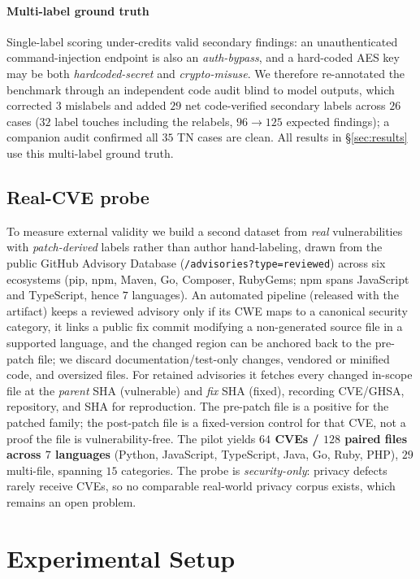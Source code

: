 \documentclass[runningheads]{llncs}
\begin{document}
\paragraph{Multi-label ground truth} Single-label scoring under-credits valid secondary findings: an unauthenticated command-injection endpoint is also an \emph{auth-bypass}, and a hard-coded AES key may be both \emph{hardcoded-secret} and \emph{crypto-misuse}. We therefore re-annotated the benchmark through an independent code audit blind to model outputs, which corrected $3$ mislabels and added $29$ net code-verified secondary labels across $26$ cases ($32$ label touches including the relabels, $96{\to}125$ expected findings); a companion audit confirmed all $35$ TN cases are clean. All results in \S\ref{sec:results} use this multi-label ground truth.

\subsection{Real-CVE probe}\label{sec:cvedata}

To measure external validity we build a second dataset from \emph{real} vulnerabilities with \emph{patch-derived} labels rather than author hand-labeling, drawn from the public GitHub Advisory Database (\texttt{/advisories?type=reviewed}) across six ecosystems (pip, npm, Maven, Go, Composer, RubyGems; npm spans JavaScript and TypeScript, hence $7$ languages). An automated pipeline (released with the artifact) keeps a reviewed advisory only if its CWE maps to a canonical security category, it links a public fix commit modifying a non-generated source file in a supported language, and the changed region can be anchored back to the pre-patch file; we discard documentation/test-only changes, vendored or minified code, and oversized files. For retained advisories it fetches every changed in-scope file at the \emph{parent} SHA (vulnerable) and \emph{fix} SHA (fixed), recording CVE/GHSA, repository, and SHA for reproduction. The pre-patch file is a positive for the patched family; the post-patch file is a fixed-version control for that CVE, not a proof the file is vulnerability-free. The pilot yields \textbf{$64$ CVEs / $128$ paired files across $7$ languages} (Python, JavaScript, TypeScript, Java, Go, Ruby, PHP), $29$ multi-file, spanning $15$ categories. The probe is \emph{security-only}: privacy defects rarely receive CVEs, so no comparable real-world privacy corpus exists, which remains an open problem.

\section{Experimental Setup}\label{sec:proto}
\end{document}
